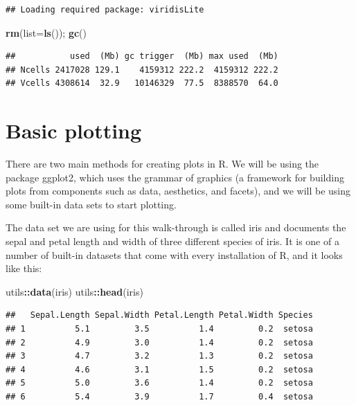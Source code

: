 \documentclass[
]{book}
\newenvironment{Shaded}{\begin{snugshade}}{\end{snugshade}}
\newcommand{\AttributeTok}[1]{\textcolor[rgb]{0.13,0.29,0.53}{#1}}
\newcommand{\FunctionTok}[1]{\textcolor[rgb]{0.13,0.29,0.53}{\textbf{#1}}}
\newcommand{\NormalTok}[1]{#1}
\newcommand{\SpecialCharTok}[1]{\textcolor[rgb]{0.81,0.36,0.00}{\textbf{#1}}}
\begin{document}
\begin{verbatim}
## Loading required package: viridisLite
\end{verbatim}

\begin{Shaded}
\begin{Highlighting}[]
\FunctionTok{rm}\NormalTok{(}\AttributeTok{list=}\FunctionTok{ls}\NormalTok{()); }\FunctionTok{gc}\NormalTok{()}
\end{Highlighting}
\end{Shaded}

\begin{verbatim}
##           used  (Mb) gc trigger  (Mb) max used  (Mb)
## Ncells 2417028 129.1    4159312 222.2  4159312 222.2
## Vcells 4308614  32.9   10146329  77.5  8388570  64.0
\end{verbatim}

\section{Basic plotting}\label{basic-plotting}

There are two main methods for creating plots in R. We will be using the package ggplot2, which uses the grammar of graphics (a framework for building plots from components such as data, aesthetics, and facets), and we will be using some built-in data sets to start plotting.

The data set we are using for this walk-through is called iris and documents the sepal and petal length and width of three different species of iris. It is one of a number of built-in datasets that come with every installation of R, and it looks like this:

\begin{Shaded}
\begin{Highlighting}[]
\NormalTok{utils}\SpecialCharTok{::}\FunctionTok{data}\NormalTok{(iris)  }
\NormalTok{utils}\SpecialCharTok{::}\FunctionTok{head}\NormalTok{(iris) }
\end{Highlighting}
\end{Shaded}

\begin{verbatim}
##   Sepal.Length Sepal.Width Petal.Length Petal.Width Species
## 1          5.1         3.5          1.4         0.2  setosa
## 2          4.9         3.0          1.4         0.2  setosa
## 3          4.7         3.2          1.3         0.2  setosa
## 4          4.6         3.1          1.5         0.2  setosa
## 5          5.0         3.6          1.4         0.2  setosa
## 6          5.4         3.9          1.7         0.4  setosa
\end{verbatim}
\end{document}
